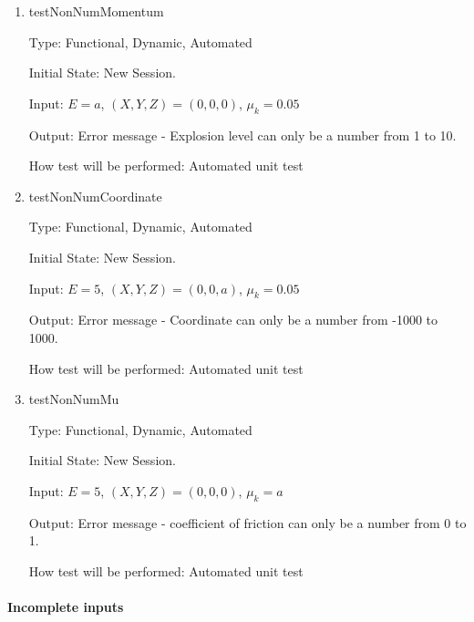 \documentclass[12pt, titlepage]{article}
\begin{document}
\begin{enumerate}

\item{testNonNumMomentum\\}

Type: Functional, Dynamic, Automated

Initial State: New Session.

Input: $E = a$, $(X,Y,Z) = (0,0,0)$, $\mu_{k} = 0.05$  

Output: Error message - Explosion level can only be a number from 1 to 10.

How test will be performed: Automated unit test

\item{testNonNumCoordinate\\}

Type: Functional, Dynamic, Automated

Initial State: New Session.

Input: $E = 5$, $(X,Y,Z) = (0,0,a)$, $\mu_{k} = 0.05$  

Output: Error message - Coordinate can only be a number from -1000 to 1000.

How test will be performed: Automated unit test

\item{testNonNumMu\\}

Type: Functional, Dynamic, Automated

Initial State: New Session.

Input: $E = 5$, $(X,Y,Z) = (0,0,0)$, $\mu_{k} = a$  

Output: Error message - coefficient of friction can only be a number from 0 to 1.

How test will be performed: Automated unit test

\end{enumerate}

\paragraph{Incomplete inputs}
\end{document}
